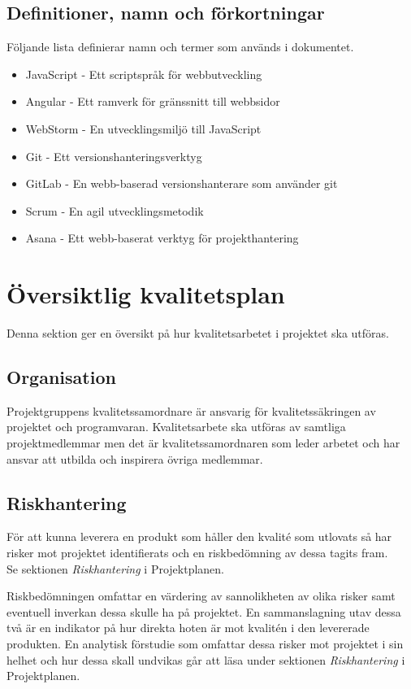 \documentclass[a4paper,10pt]{article}
\begin{document}
\subsection{Definitioner, namn och förkortningar}
Följande lista definierar namn och termer som används i dokumentet.
\begin{itemize}
    \item JavaScript - Ett scriptspråk för webbutveckling
    \item Angular - Ett ramverk för gränssnitt till webbsidor
    \item WebStorm - En utvecklingsmiljö till JavaScript
    \item Git - Ett versionshanteringsverktyg
    \item GitLab - En webb-baserad versionshanterare som använder git
    \item Scrum - En agil utvecklingsmetodik
    \item Asana - Ett webb-baserat verktyg för projekthantering
\end{itemize}

\section{Översiktlig kvalitetsplan}
Denna sektion ger en översikt på hur kvalitetsarbetet i projektet ska utföras.

\subsection{Organisation}

Projektgruppens kvalitetssamordnare är ansvarig för kvalitetssäkringen av projektet och  programvaran. Kvalitetsarbete ska utföras av samtliga projektmedlemmar men det är kvalitetssamordnaren som leder arbetet och har ansvar att utbilda och inspirera övriga medlemmar.

\subsection{Riskhantering}

För att kunna leverera en produkt som håller den kvalité som utlovats så har risker mot projektet identifierats och en riskbedömning av dessa tagits fram. \\
Se sektionen \emph{Riskhantering} i Projektplanen.

Riskbedömningen omfattar en värdering av sannolikheten av olika risker samt eventuell inverkan dessa skulle ha på projektet. En sammanslagning utav dessa två är en indikator på hur direkta hoten är mot kvalitén i den levererade produkten.
En analytisk förstudie som omfattar dessa risker mot projektet i sin helhet och hur dessa skall undvikas går att läsa under sektionen \emph{Riskhantering} i Projektplanen.
\end{document}
